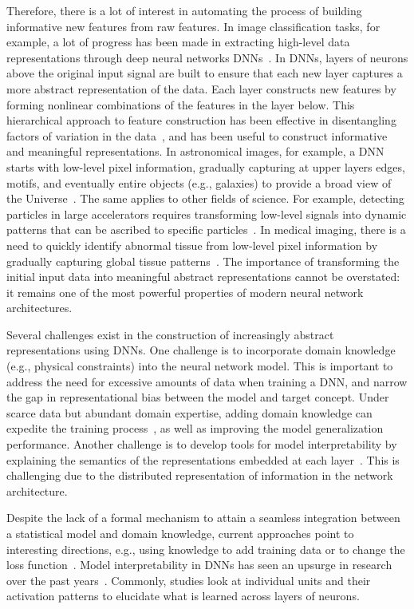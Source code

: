 Therefore, there is a lot of interest in automating the process of building informative new features from raw features.  In image classification tasks, for example, a lot of progress has been made in extracting high-level data representations through deep neural networks DNNs~\cite{Goodfellow_2016}. In DNNs, layers of neurons above the original input signal are built to ensure that each new layer captures a more abstract representation of the data. Each layer constructs new features by forming nonlinear combinations of the features in the layer below. This hierarchical approach to feature construction has been effective in disentangling factors of variation in the data~\cite{Hinton_2006,Bengio_2013,Goodfellow_2016}, and has been useful to construct informative and meaningful representations. In astronomical images, for example, a DNN starts with low-level pixel information, gradually capturing at upper layers edges, motifs, and eventually entire objects (e.g., galaxies) to provide a broad view of the Universe~\cite{Sanchez_2018,Huertas_Company_2018}. The same applies to other fields of science. For example, detecting particles in large accelerators requires transforming low-level signals into dynamic patterns that can be ascribed to specific particles~\cite{Belayneh_2020}. In medical imaging, there is a need to quickly identify abnormal tissue from low-level pixel information by gradually capturing global tissue patterns~\cite{Bychkov_2018}. The importance of transforming the initial input data into meaningful abstract representations cannot be overstated: it remains one of the most powerful properties of modern neural network architectures.  

Several challenges exist in the construction of increasingly abstract representations using DNNs. One challenge is to incorporate domain knowledge (e.g., physical constraints) into the neural network model. This is important to address the need for excessive amounts of data when training a DNN, and narrow the gap in representational bias between the model and target concept. Under scarce data but abundant domain expertise, adding domain knowledge can expedite the training process~\cite{Xie_2021}, as well as improving the model generalization performance. Another challenge is to develop tools for model interpretability by explaining the semantics of the representations embedded at each layer~\cite{Chakraborty_2017}. This is challenging due to the distributed representation of information in the network architecture. 

Despite the lack of a formal mechanism to attain a seamless integration between a statistical model and domain knowledge, current approaches point to interesting directions, e.g., using knowledge to add training data or to change the loss function~\cite{Vo_2017}. Model interpretability in DNNs has seen an upsurge in research over the past years~\cite{Chakraborty_2017}. Commonly, studies look at individual units and their activation patterns to elucidate what is learned across layers of neurons. 


